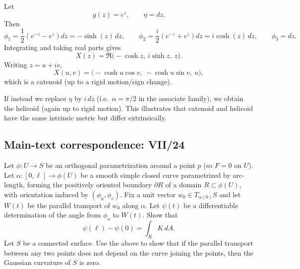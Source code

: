 \begin{solution}
	Let
	\[
	g(z)=e^{z},\qquad \eta=dz.
	\]
	Then
	\[
	\phi_1=\frac12(e^{-z}-e^{z})dz=-\sinh(z)\,dz,\qquad
	\phi_2=\frac{i}{2}(e^{-z}+e^{z})dz=i\cosh(z)\,dz,\qquad
	\phi_3=dz.
	\]
	Integrating and taking real parts gives
	\[
	X(z)=\Re\bigl(-\cosh z,\ i\sinh z,\ z\bigr).
	\]
	Writing $z=u+iv$,
	\[
	X(u,v)=\bigl(-\cosh u\cos v,\ -\cosh u\sin v,\ u\bigr),
	\]
	which is a catenoid (up to a rigid motion/sign change).
	
	If instead we replace $\eta$ by $i\,dz$ (i.e.\ $\alpha=\pi/2$ in the associate family),
	we obtain the helicoid (again up to rigid motion). This illustrates that catenoid and helicoid have the same
	intrinsic metric but differ extrinsically.
\end{solution}

\subsection*{Main-text correspondence: VII/24}

\begin{problem}
\label{prob:cp-vii-0027}
Let $\phi:U\to S$ be an orthogonal parametrization around a point $p$ (so $F=0$ on $U$).
	Let $\alpha:[0,\ell]\to \phi(U)$ be a smooth simple closed curve parametrized by arc-length, forming the positively oriented boundary $\partial R$ of a domain $R\subset\phi(U)$, with orientation induced by $(\phi_u,\phi_v)$.
	Fix a unit vector $w_0\in T_{\alpha(0)}S$ and let $W(t)$ be the parallel transport of $w_0$ along $\alpha$.
	Let $\psi(t)$ be a differentiable determination of the angle from $\phi_u$ to $W(t)$.
	Show that
	\[
	\psi(\ell)-\psi(0)=\int_R K\,dA.
	\]
	Let $S$ be a connected surface. Use the above to show that if the parallel transport between any two points does not
	depend on the curve joining the points, then the Gaussian curvature of $S$ is zero.
\end{problem}

